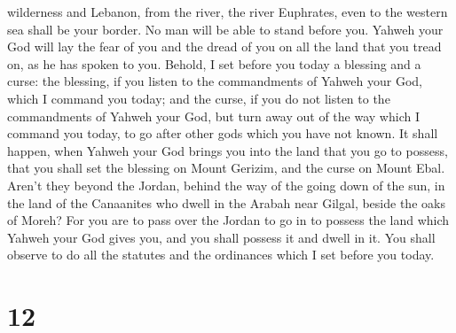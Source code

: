 wilderness and Lebanon, from the river, the river Euphrates, even to the
western sea shall be your border.  No man will be able to
stand before you. Yahweh your God will lay the fear of you and the dread
of you on all the land that you tread on, as he has spoken to you.
 Behold, I set before you today a blessing and a curse:
 the blessing, if you listen to the commandments of
Yahweh your God, which I command you today;  and the
curse, if you do not listen to the commandments of Yahweh your God, but
turn away out of the way which I command you today, to go after other
gods which you have not known.  It shall happen, when
Yahweh your God brings you into the land that you go to possess, that
you shall set the blessing on Mount Gerizim, and the curse on Mount
Ebal.  Aren't they beyond the Jordan, behind the way of
the going down of the sun, in the land of the Canaanites who dwell in
the Arabah near Gilgal, beside the oaks of Moreh?  For
you are to pass over the Jordan to go in to possess the land which
Yahweh your God gives you, and you shall possess it and dwell in it.
 You shall observe to do all the statutes and the
ordinances which I set before you today.

\hypertarget{section-11}{%
\section{12}\label{section-11}}


